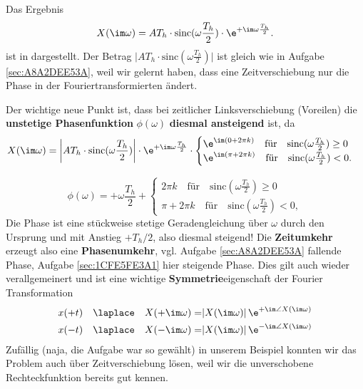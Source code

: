 \begin{Loesung}
Das Ergebnis
\begin{equation}
\label{eq:1CFE5FE3A1_Loesung}
X(\im \omega) = A T_h \cdot \mathrm{sinc}(\omega\frac{T_h}{2}) \cdot  \e^{+\im\omega\frac{T_h}{2}}.
\end{equation}
ist in  dargestellt. Der Betrag
$\bigg|A T_h \cdot \mathrm{sinc}(\omega\frac{T_h}{2})\bigg|$
ist gleich wie in Aufgabe \ref{sec:A8A2DEE53A}, weil wir gelernt haben, dass
eine Zeitverschiebung nur die Phase in der Fouriertransformierten ändert.
%

Der wichtige neue Punkt ist, dass bei zeitlicher Linksverschiebung (Voreilen)
die \textbf{unstetige Phasenfunktion} $\phi(\omega)$
\textbf{diesmal ansteigend} ist,  da
\begin{equation}
X(\im \omega) = \bigg|A T_h \cdot \mathrm{sinc}(\omega\frac{T_h}{2})\bigg|
\cdot  \e^{+\im\omega\frac{T_h}{2}}\cdot
\begin{cases}
\e^{\im (0+2\pi k)}\quad \text{für}\quad \mathrm{sinc}(\omega\frac{T_h}{2})\geq0\\
\e^{\im (\pi + 2\pi k)}\quad \text{für}\quad\mathrm{sinc}(\omega\frac{T_h}{2})<0.
\end{cases}
\end{equation}

\begin{equation}
\phi(\omega) = +\omega\frac{T_h}{2} +
\begin{cases}
2\pi k\quad \text{für}\quad \mathrm{sinc}(\omega\frac{T_h}{2})\geq0\\
\pi + 2\pi k\quad \text{für}\quad\mathrm{sinc}(\omega\frac{T_h}{2})<0,
\end{cases}
\end{equation}
Die Phase ist eine stückweise stetige Geradengleichung über $\omega$ durch den
Ursprung und mit Anstieg $+T_h/2$, also diesmal steigend!
%
Die \textbf{Zeitumkehr} erzeugt also eine \textbf{Phasenumkehr}, vgl.
Aufgabe \ref{sec:A8A2DEE53A} fallende Phase, Aufgabe \ref{sec:1CFE5FE3A1} hier steigende Phase.
%
Dies gilt auch wieder verallgemeinert und ist eine wichtige \textbf{Symmetrie}eigenschaft
der Fourier Transformation
%
\begin{align}
x(+t) \quad \laplace \quad X(+\im\omega) =& |X(\im\omega)| \, \e^{+\im\angle X(\im\omega)}\\
x(-t) \quad \laplace \quad X(-\im\omega) =& |X(\im\omega)| \, \e^{-\im\angle X(\im\omega)}
\end{align}
%
Zufällig (naja, die Aufgabe war so gewählt)
in unserem Beispiel konnten wir das Problem auch über Zeitverschiebung
lösen, weil wir die unverschobene Rechteckfunktion bereits gut kennen.
\end{Loesung}
